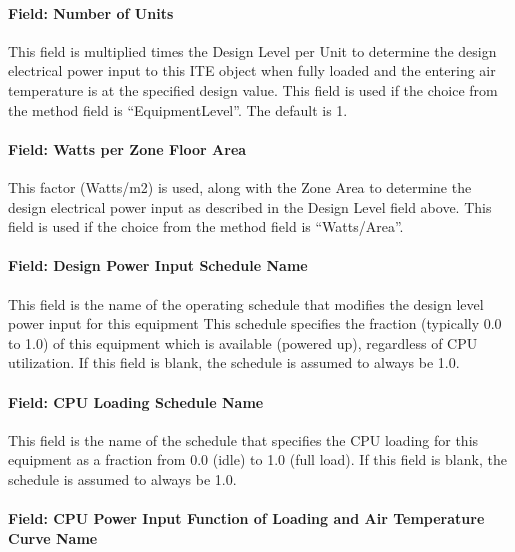 \paragraph{Field: Number of Units}\label{field-number-of-units}

This field is multiplied times the Design Level per Unit to determine the design electrical power input to this ITE object when fully loaded and the entering air temperature is at the specified design value. This field is used if the choice from the method field is ``EquipmentLevel''. The default is 1.

\paragraph{Field: Watts per Zone Floor Area}\label{field-watts-per-zone-floor-area-2}

This factor (Watts/m2) is used, along with the Zone Area to determine the design electrical power input as described in the Design Level field above. This field is used if the choice from the method field is ``Watts/Area''.

\paragraph{Field: Design Power Input Schedule Name}\label{field-design-power-input-schedule-name}

This field is the name of the operating schedule that modifies the design level power input for this equipment This schedule specifies the fraction (typically 0.0 to 1.0) of this equipment which is available (powered up), regardless of CPU utilization. If this field is blank, the schedule is assumed to always be 1.0.

\paragraph{Field: CPU Loading Schedule Name}\label{field-cpu-loading-schedule-name}

This field is the name of the schedule that specifies the CPU loading for this equipment as a fraction from 0.0 (idle) to 1.0 (full load). If this field is blank, the schedule is assumed to always be 1.0.

\paragraph{Field: CPU Power Input Function of Loading and Air Temperature Curve Name}\label{field-cpu-power-input-function-of-loading-and-air-temperature-curve-name}

